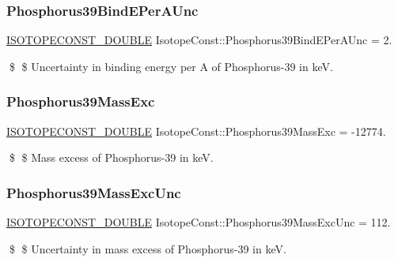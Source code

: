 \subsubsection{\texorpdfstring{Phosphorus39\+Bind\+E\+Per\+A\+Unc}{Phosphorus39BindEPerAUnc}}
{\footnotesize\ttfamily \mbox{\hyperlink{group___isotope_const-_macros_ga8f45a7272ce02c0b4c65c44636ed719a}{I\+S\+O\+T\+O\+P\+E\+C\+O\+N\+S\+T\+\_\+\+D\+O\+U\+B\+LE}} Isotope\+Const\+::\+Phosphorus39\+Bind\+E\+Per\+A\+Unc = 2.}

\$ \$ Uncertainty in binding energy per A of Phosphorus-\/39 in keV. \mbox{\label{group___isotope_const-_phosphorus-_p39_ga4642e54bb754176fc7d0db8594692b37}} 
\subsubsection{\texorpdfstring{Phosphorus39\+Mass\+Exc}{Phosphorus39MassExc}}
{\footnotesize\ttfamily \mbox{\hyperlink{group___isotope_const-_macros_ga8f45a7272ce02c0b4c65c44636ed719a}{I\+S\+O\+T\+O\+P\+E\+C\+O\+N\+S\+T\+\_\+\+D\+O\+U\+B\+LE}} Isotope\+Const\+::\+Phosphorus39\+Mass\+Exc = -\/12774.}

\$ \$ Mass excess of Phosphorus-\/39 in keV. \mbox{\label{group___isotope_const-_phosphorus-_p39_ga1d7fcbb83f69faf10091250dcd905fab}} 
\subsubsection{\texorpdfstring{Phosphorus39\+Mass\+Exc\+Unc}{Phosphorus39MassExcUnc}}
{\footnotesize\ttfamily \mbox{\hyperlink{group___isotope_const-_macros_ga8f45a7272ce02c0b4c65c44636ed719a}{I\+S\+O\+T\+O\+P\+E\+C\+O\+N\+S\+T\+\_\+\+D\+O\+U\+B\+LE}} Isotope\+Const\+::\+Phosphorus39\+Mass\+Exc\+Unc = 112.}

\$ \$ Uncertainty in mass excess of Phosphorus-\/39 in keV. \mbox{\label{group___isotope_const-_phosphorus-_p39_ga2289a70cf097d4042fb661520872023b}} 
